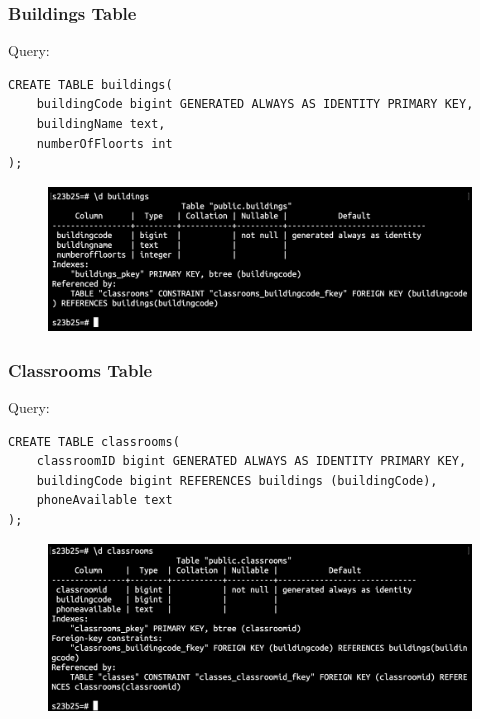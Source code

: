 \documentclass{article}
\begin{document}
\subsubsection*{Buildings Table}
Query:
\begin{Verbatim}[frame=single,framerule=1pt,fontfamily=courier,fontsize=\small]
CREATE TABLE buildings(
    buildingCode bigint GENERATED ALWAYS AS IDENTITY PRIMARY KEY,
    buildingName text,
    numberOfFloorts int
);
\end{Verbatim}
\begin{figure}[h]
    \centering
    \includegraphics[width=\textwidth]{./o_7_buildings.png}
\end{figure}

\subsubsection*{Classrooms Table}
Query:
\begin{Verbatim}[frame=single,framerule=1pt,fontfamily=courier,fontsize=\small]
CREATE TABLE classrooms(
    classroomID bigint GENERATED ALWAYS AS IDENTITY PRIMARY KEY,
    buildingCode bigint REFERENCES buildings (buildingCode),
    phoneAvailable text
);
\end{Verbatim}
\begin{figure}[h]
    \centering
    \includegraphics[width=\textwidth]{./o_8_classrooms.png}
\end{figure}
\end{document}
